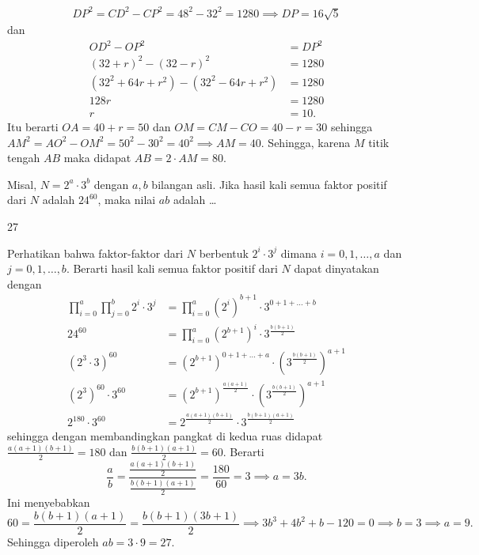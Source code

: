 \documentclass[12pt]{scrartcl}
\begin{document}
\begin{solusi}
\begin{align*}
DP^2 = CD^2 - CP^2 = 48^2 - 32^2 = 1280 \implies DP = 16\sqrt{5}
\end{align*}
dan
\begin{align*}
OD^2 - OP^2 &= DP^2\\
(32+r)^2 - (32-r)^2 &= 1280\\
(32^2+64r+r^2)-(32^2-64r+r^2) &= 1280\\
128r &= 1280\\
r &= 10.
\end{align*}
Itu berarti $OA=40+r=50$ dan $OM = CM - CO = 40-r=30$ sehingga $AM^2 = AO^2-OM^2 = 50^2 - 30^2 = 40^2 \implies AM = 40$. Sehingga, karena $M$ titik tengah $AB$ maka didapat $AB = 2 \cdot AM = \boxed{80}$.
\end{solusi}

\begin{soalbaru}
Misal, $N = 2^a \cdot 3^b$ dengan $a, b$ bilangan asli. Jika hasil kali semua faktor positif dari $N$ adalah $24^{60}$, maka nilai $ab$ adalah \dots
\end{soalbaru}
\begin{jawaban}
27
\end{jawaban}
\begin{solusi}
Perhatikan bahwa faktor-faktor dari $N$ berbentuk $2^i \cdot 3^j$ dimana $i=0,1,\dots,a$ dan $j=0,1,\dots,b$. Berarti hasil kali semua faktor positif dari $N$ dapat dinyatakan dengan
\begin{align*}
\prod_{i=0}^{a} \prod_{j=0}^{b} 2^i \cdot 3^j &= \prod_{i=0}^{a}  (2^i)^{b+1} \cdot 3^{0+1+\dots+b}\\
24^{60} &= \prod_{i=0}^{a}  (2^{b+1})^i \cdot 3^{\frac{b(b+1)}{2}}\\
(2^3\cdot 3)^{60} &= (2^{b+1})^{0+1+\dots+a} \cdot (3^{\frac{b(b+1)}{2}})^{a+1}\\
(2^3)^{60}\cdot3^{60} &= (2^{b+1})^{\frac{a(a+1)}{2}} \cdot (3^{\frac{b(b+1)}{2}})^{a+1}\\
2^{180}\cdot 3^{60} &= 2^{\frac{a(a+1)(b+1)}{2}} \cdot 3^{\frac{b(b+1)(a+1)}{2}}
\end{align*}
sehingga dengan membandingkan pangkat di kedua ruas didapat $\frac{a(a+1)(b+1)}{2}=180$ dan $\frac{b(b+1)(a+1)}{2}=60$. Berarti
$$\dfrac{a}{b}=\dfrac{\frac{a(a+1)(b+1)}{2}}{\frac{b(b+1)(a+1)}{2}}=\dfrac{180}{60}=3 \implies a = 3b.$$
Ini menyebabkan
$$60=\frac{b(b+1)(a+1)}{2}=\frac{b(b+1)(3b+1)}{2} \implies 3b^3+4b^2+b-120=0 \implies b=3 \implies a = 9.$$
Sehingga diperoleh $ab = 3 \cdot 9 = \boxed{27}$.
\end{solusi}
\end{document}
